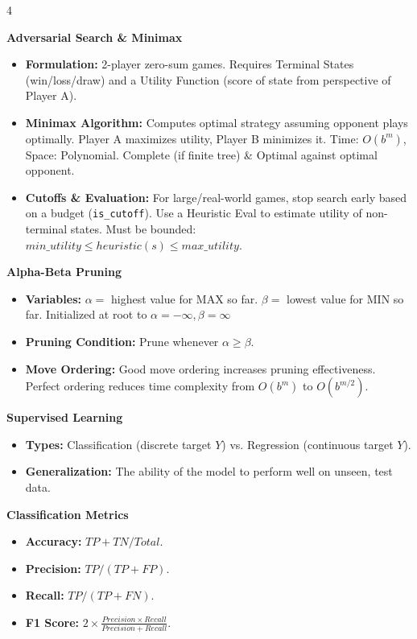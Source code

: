 \documentclass[8pt,landscape,a4paper]{extarticle}
\begin{document}
\begin{multicols*}{4}
{\vspace{1mm}
\noindent\textbf{Adversarial Search \& Minimax}
\begin{itemize}[leftmargin=*, nosep]
    \item \textbf{Formulation:} 2-player zero-sum games. Requires Terminal States (win/loss/draw) and a Utility Function (score of state from perspective of Player A). 
    \item \textbf{Minimax Algorithm:} Computes optimal strategy assuming opponent plays optimally. Player A maximizes utility, Player B minimizes it. Time: $O(b^m)$, Space: Polynomial. Complete (if finite tree) \& Optimal against optimal opponent.
    \item \textbf{Cutoffs \& Evaluation:} For large/real-world games, stop search early based on a budget (\texttt{is\_cutoff}). Use a Heuristic Eval to estimate utility of non-terminal states. Must be bounded: $min\_utility \le heuristic(s) \le max\_utility$.
\end{itemize}

\vspace{1mm}
\noindent\textbf{Alpha-Beta Pruning}
\begin{itemize}[leftmargin=*, nosep]
    \item \textbf{Variables:} $\alpha =$ highest value for MAX so far. $\beta =$ lowest value for MIN so far. Initialized at root to $\alpha = -\infty, \beta = \infty$
    \item \textbf{Pruning Condition:} Prune whenever $\alpha \geq \beta$.
    \item \textbf{Move Ordering:} Good move ordering increases pruning effectiveness. Perfect ordering reduces time complexity from $O(b^m)$ to $O(b^{m/2})$.
\end{itemize}

\noindent\textbf{Supervised Learning}
\begin{itemize}[leftmargin=*, nosep]
    \item \textbf{Types:} Classification (discrete target $Y$) vs. Regression (continuous target $Y$).
    \item \textbf{Generalization:} The ability of the model to perform well on unseen, test data.
\end{itemize}

\vspace{1mm}
\noindent\textbf{Classification Metrics}
\begin{itemize}[leftmargin=*, nosep]
    \item \textbf{Accuracy:} $TP + TN/ Total$.
    \item \textbf{Precision:} $TP / (TP + FP)$.
    \item \textbf{Recall:} $TP / (TP + FN)$. 
    \item \textbf{F1 Score:} $2 \times \frac{Precision \times Recall}{Precision + Recall}$.
\end{itemize}

}
\end{multicols*}
\end{document}

